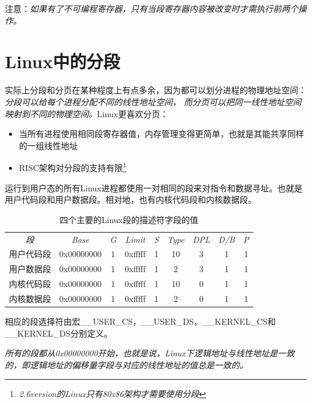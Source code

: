     注意：\emph{如果有了不可编程寄存器，只有当段寄存器内容被改变时才需执行前两个操作。}

\section{Linux中的分段}

    实际上分段和分页在某种程度上有点多余，因为都可以划分进程的物理地址空间：\emph{分段可以给每个进程分配不同的线性地址空间， 而分页可以把同一线性地址空间映射到不同的物理空间。}Linux更喜欢分页：

\begin{itemize}
    \item 当所有进程使用相同段寄存器值，内存管理变得更简单，也就是其能共享同样的一组线性地址
    \item RISC架构对分段的支持有限\footnote[1]{\emph{2.6version的Linux只有80x86架构才需要使用分段}}
\end{itemize}

    运行到用户态的所有Linux进程都使用一对相同的段来对指令和数据寻址。也就是用户代码段和用户数据段。相对地，也有内核代码段和内核数据段。

\begin{table}[!htbp]
    \begin{center}
        \caption{四个主要的Linux段的描述符字段的值}
        \begin{tabular}{c c c c c c c c c}
            \hline
            \emph{段} & \emph{Base} & \emph{G} & \emph{Limit} & \emph{S} & \emph{Type} & \emph{DPL} & \emph{D/B} & \emph{P} \\
            用户代码段 & 0x00000000 & 1 & 0xfffff & 1 & 10 & 3 & 1 & 1 \\
            用户数据段 & 0x00000000 & 1 & 0xfffff & 1 & 2 & 3 & 1 & 1 \\
            内核代码段 & 0x00000000 & 1 & 0xfffff & 1 & 10 & 0 & 1 & 1 \\
            内核数据段 & 0x00000000 & 1 & 0xfffff & 1 & 2 & 0 & 1 & 1 \\
            \hline
        \end{tabular}
    \end{center}
\end{table}

    相应的段选择符由宏\_\_USER\_CS，\_\_USER\_DS，\_\_KERNEL\_CS和\_\_KERNEL\_DS分别定义。

    \emph{所有的段都从0x00000000开始，也就是说，Linux下逻辑地址与线性地址是一致的，即逻辑地址的偏移量字段与对应的线性地址的值总是一致的。}

